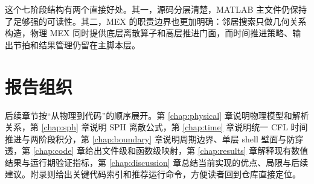 这个七阶段结构有两个直接好处。其一，源码分层清楚，MATLAB 主文件仍保持了足够强的可读性。其二，MEX 的职责边界也更加明确：邻居搜索只做几何关系构造，物理 MEX 同时提供底层离散算子和高层推进门面，而时间推进策略、输出节拍和结果管理仍留在主脚本层。

\section{报告组织}
后续章节按“从物理到代码”的顺序展开。第 \ref{chap:physical} 章说明物理模型和解析关系，第 \ref{chap:sph} 章说明 SPH 离散公式，第 \ref{chap:time} 章说明统一 CFL 时间推进与两阶段积分，第 \ref{chap:boundary} 章说明周期边界、单层 shell 壁面与防穿透，第 \ref{chap:code} 章给出文件级和函数级映射，第 \ref{chap:results} 章解释现有数值结果与运行期验证指标，第 \ref{chap:discussion} 章总结当前实现的优点、局限与后续建议。附录则给出关键代码索引和推荐运行命令，方便读者回到仓库直接定位。

